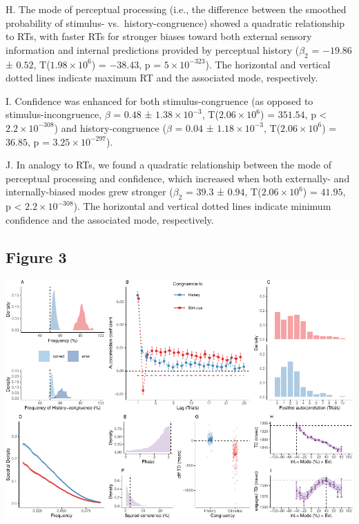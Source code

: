 \documentclass[
]{article}
\begin{document}
H. The mode of perceptual processing (i.e., the difference between the
smoothed probability of stimulus- vs.~history-congruence) showed a
quadratic relationship to RTs, with faster RTs for stronger biases
toward both external sensory information and internal predictions
provided by perceptual history (\(\beta_2\) = \(-19.86\) ± \(0.52\),
T(\(\ensuremath{1.98\times 10^{6}}\)) = \(-38.43\), p =
\(\ensuremath{5\times 10^{-323}}\)). The horizontal and vertical dotted
lines indicate maximum RT and the associated mode, respectively.

I. Confidence was enhanced for both stimulus-congruence (as opposed to
stimulus-incongruence, \(\beta\) = \(0.48\) ±
\(\ensuremath{1.38\times 10^{-3}}\),
T(\(\ensuremath{2.06\times 10^{6}}\)) = \(351.54\), p < \(\ensuremath{2.2\times 10^{-308}}\)) and
history-congruence (\(\beta\) = \(0.04\) ±
\(\ensuremath{1.18\times 10^{-3}}\),
T(\(\ensuremath{2.06\times 10^{6}}\)) = \(36.85\), p =
\(\ensuremath{3.25\times 10^{-297}}\)).

J. In analogy to RTs, we found a quadratic relationship between the mode
of perceptual processing and confidence, which increased when both
externally- and internally-biased modes grew stronger (\(\beta_2\) =
\(39.3\) ± \(0.94\), T(\(\ensuremath{2.06\times 10^{6}}\)) = \(41.95\),
p < \(\ensuremath{2.2\times 10^{-308}}\)). The horizontal and vertical dotted lines indicate minimum
confidence and the associated mode, respectively.

\newpage

\hypertarget{figure-3}{%
\subsection{Figure 3}\label{figure-3}}

\includegraphics{modes_mouse_rev1b_clean_files/figure-latex/Figure_3-1.pdf}
\end{document}
